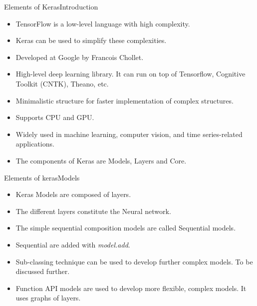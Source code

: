 \documentclass{beamer}
\begin{document}
\begin{frame}{Elements of Keras}{Introduction}

\begin{itemize}
    \item TensorFlow is a low-level language with high complexity. 
    \item Keras can be used to simplify these complexities. 
    \item Developed at Google by Francois Chollet.
\item 
High-level deep learning library. It
can run on top of  Tensorflow, Cognitive Toolkit (CNTK), Theano, etc. 
\item Minimalistic structure for 
faster implementation of complex structures. 

\item Supports CPU and
GPU.
\item Widely used in machine learning, computer vision, and
time series-related applications.
\item    The components of Keras are  Models, Layers and Core. 
\end{itemize}
\end{frame}
\begin{frame}{Elements of keras}{Models}

\begin{itemize}   
\item Keras Models are composed of layers. 
\item The different layers constitute the Neural network. \item  The simple sequential composition models are called Sequential models. 
\item Sequential are added with \emph{model.add}. 

\item Sub-classing technique can be used to develop further complex models. To be discussed further.
\item Function API models are used to develop more flexible, complex models.  It uses graphs of layers.\\
\end{itemize}
\end{frame}
\end{document}
